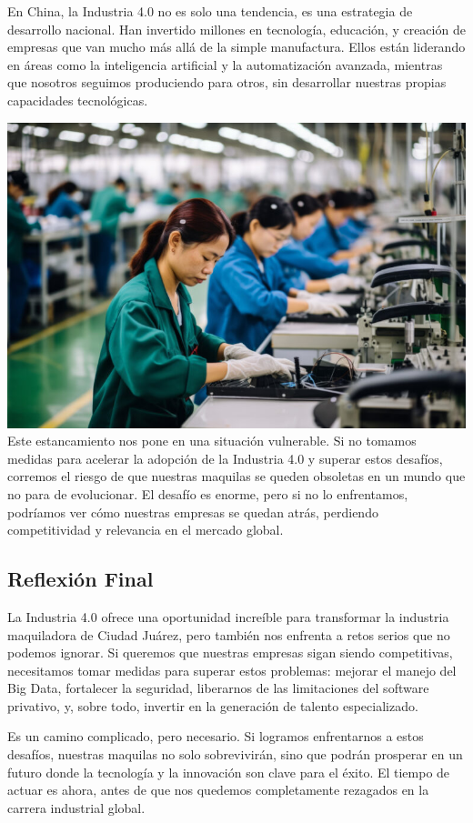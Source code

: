 \documentclass[
  letterpaper,
]{book}
\begin{document}
En China, la Industria 4.0 no es solo una tendencia, es una estrategia
de desarrollo nacional. Han invertido millones en tecnología, educación,
y creación de empresas que van mucho más allá de la simple manufactura.
Ellos están liderando en áreas como la inteligencia artificial y la
automatización avanzada, mientras que nosotros seguimos produciendo para
otros, sin desarrollar nuestras propias capacidades tecnológicas.

\includegraphics{Img/china.jpg} Este estancamiento nos pone en una
situación vulnerable. Si no tomamos medidas para acelerar la adopción de
la Industria 4.0 y superar estos desafíos, corremos el riesgo de que
nuestras maquilas se queden obsoletas en un mundo que no para de
evolucionar. El desafío es enorme, pero si no lo enfrentamos, podríamos
ver cómo nuestras empresas se quedan atrás, perdiendo competitividad y
relevancia en el mercado global.

\subsection{Reflexión Final}\label{reflexiuxf3n-final}

La Industria 4.0 ofrece una oportunidad increíble para transformar la
industria maquiladora de Ciudad Juárez, pero también nos enfrenta a
retos serios que no podemos ignorar. Si queremos que nuestras empresas
sigan siendo competitivas, necesitamos tomar medidas para superar estos
problemas: mejorar el manejo del Big Data, fortalecer la seguridad,
liberarnos de las limitaciones del software privativo, y, sobre todo,
invertir en la generación de talento especializado.

Es un camino complicado, pero necesario. Si logramos enfrentarnos a
estos desafíos, nuestras maquilas no solo sobrevivirán, sino que podrán
prosperar en un futuro donde la tecnología y la innovación son clave
para el éxito. El tiempo de actuar es ahora, antes de que nos quedemos
completamente rezagados en la carrera industrial global.
\end{document}
